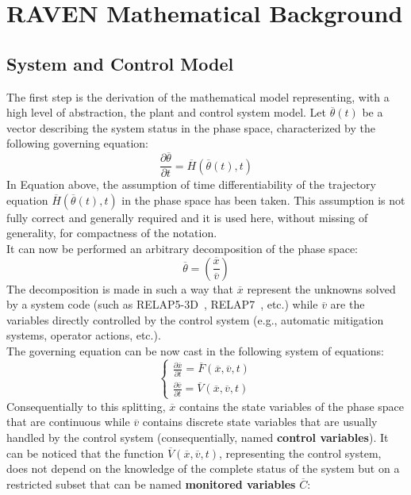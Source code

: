 \section{RAVEN Mathematical Background}
\label{sec:mathBackground}
\subsection{System and Control Model}
\label{sub:controlAndSystem}
The first step is the derivation of the mathematical model representing, with a high
level of abstraction, the plant and control system model. Let $\overline{\theta}\left ( t
\right )$ be a vector describing the system status in the phase space, characterized
by the following governing equation:
\begin{equation}
\label{eq:dThetaOverDT}
\frac{\partial \overline{\theta} }{\partial t}=\overline{H}\left (  \overline{\theta}\left ( t \right ),t \right )
\end{equation}
In Equation above, the assumption of time differentiability of the trajectory equation $\overline{H}\left (  \overline{\theta}\left ( t \right ),t \right )$ in the phase space has been taken. This assumption is not fully correct and generally required and it is used here, without missing of generality, for compactness of the notation.
\\It can now be performed an arbitrary decomposition of the phase space:
\begin{equation}
\label{eq:thetaDecomposition}
  \overline{\theta} = \left (\frac{\overline{x}}{\overline{v}}  \right )
\end{equation}
The decomposition is made in such a way that $\overline{x}$ represent the unknowns
solved by a system code (such as RELAP5-3D~\cite{RELAP5userManual},
RELAP7~\cite{relap7FY12}, etc.) while $\overline{v}$ are the variables directly
controlled by the control system (e.g., automatic mitigation systems, operator actions,
etc.).
\\The governing equation can be now cast in the following system of equations:
\begin{equation}
\label{eq:governingEquations}
\left\{\begin{matrix}
\frac{\partial \overline{x} }{\partial t} = \overline{F}\left (  \overline{x}, \overline{v}, t \right )  \\
\frac{\partial \overline{v} }{\partial t} = \overline{V}\left (  \overline{x}, \overline{v}, t \right )
\end{matrix}\right.
\end{equation}
Consequentially to this splitting, $\overline{x}$ contains the state variables of the
phase space that are continuous while $\overline{v}$ contains discrete state
variables that are usually handled by the control system (consequentially, named
\textbf{control variables}). It can be noticed that the
function  $ \overline{V}\left (  \overline{x}, \overline{v}, t \right )$, representing the
control system, does not depend on the  knowledge of the complete status of the
system but on a restricted subset that can be named \textbf{monitored variables} $\overline{C}$:

